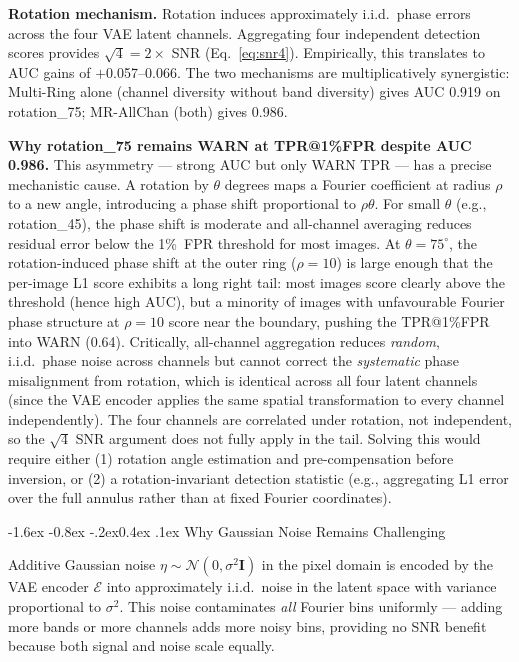 \documentclass[10pt,twocolumn]{article}
\makeatletter
\renewcommand\subsection{\@startsection{subsection}{2}{\z@}%
  {-1.6ex \@plus -0.8ex \@minus -.2ex}{0.4ex \@plus .1ex}%
  {\normalfont\normalsize\itshape}}
\makeatother
\begin{document}
\textbf{Rotation mechanism.}
Rotation induces approximately i.i.d.\ phase errors across the four
VAE latent channels.
Aggregating four independent detection scores provides
$\sqrt{4} = 2\times$ SNR (Eq.~\ref{eq:snr4}).
Empirically, this translates to AUC gains of $+$0.057--0.066.
The two mechanisms are multiplicatively synergistic: Multi-Ring alone
(channel diversity without band diversity) gives AUC 0.919 on
rotation\_75; MR-AllChan (both) gives 0.986.

\textbf{Why rotation\_75 remains WARN at TPR@1\%FPR despite AUC 0.986.}
This asymmetry --- strong AUC but only WARN TPR --- has a precise
mechanistic cause.
A rotation by $\theta$ degrees maps a Fourier coefficient at radius
$\rho$ to a new angle, introducing a phase shift proportional to
$\rho\theta$.
For small $\theta$ (e.g., rotation\_45), the phase shift is moderate
and all-channel averaging reduces residual error below the 1\%~FPR
threshold for most images.
At $\theta{=}75^\circ$, the rotation-induced phase shift at the outer
ring ($\rho{=}10$) is large enough that the per-image L1 score
exhibits a long right tail: most images score clearly above the
threshold (hence high AUC), but a minority of images with
unfavourable Fourier phase structure at $\rho{=}10$ score near the
boundary, pushing the TPR@1\%FPR into WARN (0.64).
Critically, all-channel aggregation reduces \emph{random}, i.i.d.\
phase noise across channels but cannot correct the \emph{systematic}
phase misalignment from rotation, which is identical across all
four latent channels (since the VAE encoder applies the same
spatial transformation to every channel independently).
The four channels are correlated under rotation, not independent,
so the $\sqrt{4}$ SNR argument does not fully apply in the tail.
Solving this would require either (1) rotation angle estimation and
pre-compensation before inversion, or (2) a rotation-invariant
detection statistic (e.g., aggregating L1 error over the full annulus
rather than at fixed Fourier coordinates).

\subsection{Why Gaussian Noise Remains Challenging}

Additive Gaussian noise $\eta \sim \mathcal{N}(0, \sigma^2\mathbf{I})$
in the pixel domain is encoded by the VAE encoder $\mathcal{E}$
into approximately i.i.d.\ noise in the latent space with variance
proportional to $\sigma^2$.
This noise contaminates \emph{all} Fourier bins uniformly --- adding
more bands or more channels adds more noisy bins, providing no SNR
benefit because both signal and noise scale equally.
\end{document}
